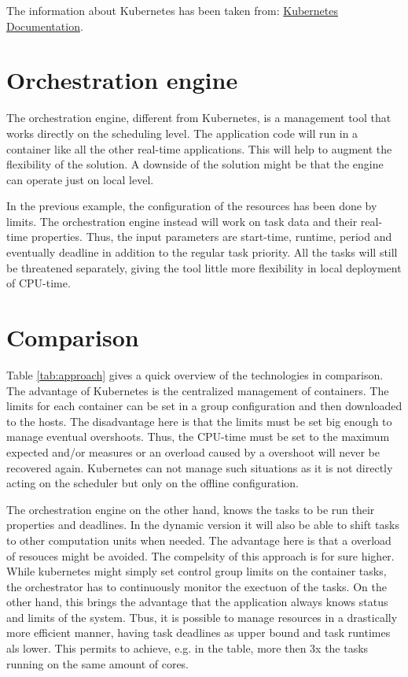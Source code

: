 \documentclass[]{scrartcl}
\begin{document}
The information about Kubernetes has been taken from:
\href{https://kubernetes.io/docs/concepts/configuration/manage-compute-resources-container/}{Kubernetes Documentation}.


\section{Orchestration engine}

The orchestration engine, different from Kubernetes, is a management tool that works directly on the scheduling level. The application code will run in a container like all the other real-time applications. This will help to augment the flexibility of the solution. A downside of the solution might be that the engine can operate just on local level.

In the previous example, the configuration of the resources has been done by limits. The orchestration engine instead will work on task data and their real-time properties. 
Thus, the input parameters are start-time, runtime, period and eventually deadline in addition to the regular task priority.
All the tasks will still be threatened separately, giving the tool little more flexibility in local deployment of CPU-time.


\section{Comparison}

Table \ref{tab:approach} gives a quick overview of the technologies in comparison.
The advantage of Kubernetes is the centralized management of containers. The limits for each container can be set in a group configuration and then downloaded to the hosts. The disadvantage here is that the limits must be set big enough to manage eventual overshoots. Thus, the CPU-time must be set to the maximum expected and/or measures or an overload caused by a overshoot will never be recovered again.
Kubernetes can not manage such situations as it is not directly acting on the scheduler but only on the offline configuration.

The orchestration engine on the other hand, knows the tasks to be run their properties and deadlines. In the dynamic version it will also be able to shift tasks to other computation units when needed. The advantage here is that a overload of resouces might be avoided.
The compelsity of this approach is for sure higher. While kubernetes might simply set control group limits on the container tasks, the orchestrator has to continuously monitor the exectuon of the tasks.
On the other hand, this brings the advantage that the application always knows status and limits of the system. Tbus, it is possible to manage resources in a drastically more efficient manner, having task deadlines as upper bound and task runtimes als lower. This permits to achieve, e.g. in the table, more then 3x the tasks running on the same amount of cores.
\end{document}
